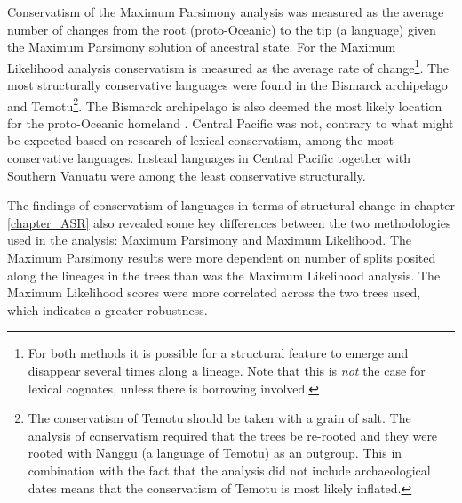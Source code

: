 \documentclass[draft,10pt]{article} %
\begin{document}
Conservatism of the Maximum Parsimony analysis was measured as the average number of changes from the root (proto-Oceanic) to the tip (a language) given the Maximum Parsimony solution of ancestral state. For the Maximum Likelihood analysis conservatism is measured as the average rate of change\footnote{For both methods it is possible for a structural feature to emerge and disappear several times along a lineage. Note that this is \emph{not} the case for lexical cognates, unless there is borrowing involved.}. The most structurally conservative languages were found in the Bismarck archipelago and Temotu\footnote{The conservatism of Temotu should be taken with a grain of salt. The analysis of conservatism required that the trees be re-rooted and they were rooted with Nanggu (a language of Temotu) as an outgroup. This in combination with the fact that the analysis did not include archaeological dates means that the conservatism of Temotu is most likely inflated.}. The Bismarck archipelago is also deemed the most likely location for the proto-Oceanic homeland \citep[97]{lynchrosscrowleyinternalsubgroupingoceanic}. Central Pacific was not, contrary to what might be expected based on research of lexical conservatism, among the most conservative languages. Instead languages in Central Pacific together with Southern Vanuatu were among the least conservative structurally.

The findings of conservatism of languages in terms of structural change in chapter \ref{chapter_ASR} also revealed some key differences between the two methodologies used in the analysis: Maximum Parsimony and Maximum Likelihood. The Maximum Parsimony results were more dependent on number of splits posited along the lineages in the trees than was the Maximum Likelihood analysis. The Maximum Likelihood scores were more correlated across the two trees used, which indicates a greater robustness.
\end{document}
